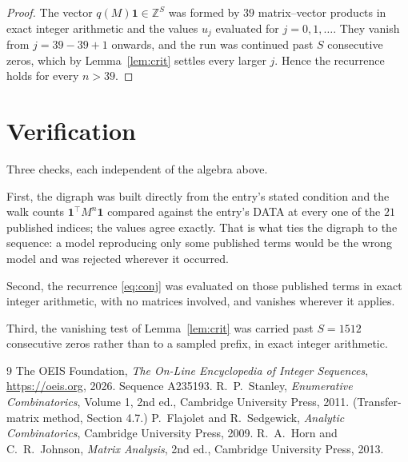 \documentclass[11pt,a4paper]{article}
\theoremstyle{plain}
\theoremstyle{definition}
\begin{document}
\begin{proof}
The vector $q(M)\mathbf{1}\in\mathbb{Z}^{S}$ was formed by $39$ matrix--vector
products in exact integer arithmetic and the values $u_j$ evaluated for
$j=0,1,\dots$. They vanish from $j=39-39+1$ onwards, and the run was continued past
$S$ consecutive zeros, which by Lemma~\ref{lem:crit} settles every larger $j$. Hence the
recurrence holds for every $n>39$.
\end{proof}

\section{Verification}

Three checks, each independent of the algebra above.

First, the digraph was built directly from the entry's stated condition and the walk counts
$\mathbf{1}^{\!\top}M^{n}\mathbf{1}$ compared against the entry's DATA at every one of
the $21$ published indices; the values agree exactly. That is what ties the digraph to
the sequence: a model reproducing only some published terms would be the wrong model and
was rejected wherever it occurred.

Second, the recurrence \eqref{eq:conj} was evaluated on those published terms in exact
integer arithmetic, with no matrices involved, and vanishes wherever it applies.

Third, the vanishing test of Lemma~\ref{lem:crit} was carried past $S=1512$ consecutive
zeros rather than to a sampled prefix, in exact integer arithmetic.

\begin{thebibliography}{9}
 The OEIS Foundation, \emph{The On-Line Encyclopedia of Integer
Sequences}, \url{https://oeis.org}, 2026. Sequence A235193.
 R.~P.~Stanley, \emph{Enumerative Combinatorics}, Volume 1, 2nd ed.,
Cambridge University Press, 2011. (Transfer-matrix method, Section 4.7.)
 P.~Flajolet and R.~Sedgewick, \emph{Analytic Combinatorics}, Cambridge
University Press, 2009.
 R.~A.~Horn and C.~R.~Johnson, \emph{Matrix Analysis}, 2nd ed., Cambridge
University Press, 2013.
\end{thebibliography}
\end{document}
